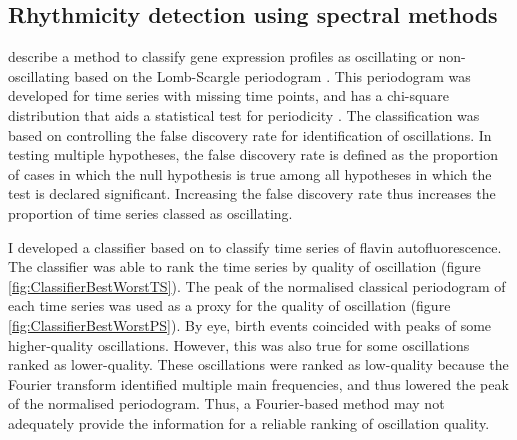 \subsection{Rhythmicity detection using spectral methods}
\label{subsec:analysis-classification-spectral}



\textcite{glynnDetectingPeriodicPatterns2006} describe a method to classify gene expression profiles as oscillating or non-oscillating based on the Lomb-Scargle periodogram \parencite{lombLeastsquaresFrequencyAnalysis1976}.
This periodogram was developed for time series with missing time points, and has a chi-square distribution that aids a statistical test for periodicity \parencite{scargleStudiesAstronomicalTime1982}.
The classification was based on controlling the false discovery rate for identification of oscillations.
In testing multiple hypotheses, the false discovery rate is defined as the proportion of cases in which the null hypothesis is true among all hypotheses in which the test is declared significant.
Increasing the false discovery rate thus increases the proportion of time series classed as oscillating.

I developed a classifier based on \textcite{glynnDetectingPeriodicPatterns2006} to classify time series of flavin autofluorescence.
The classifier was able to rank the time series by quality of oscillation (figure \ref{fig:ClassifierBestWorstTS}).
The peak of the normalised classical periodogram of each time series was used as a proxy for the quality of oscillation (figure \ref{fig:ClassifierBestWorstPS}).
By eye, birth events coincided with peaks of some higher-quality oscillations.
However, this was also true for some oscillations ranked as lower-quality.
These oscillations were ranked as low-quality because the Fourier transform identified multiple main frequencies, and thus lowered the peak of the normalised periodogram.
Thus, a Fourier-based method may not adequately provide the information for a reliable ranking of oscillation quality.

